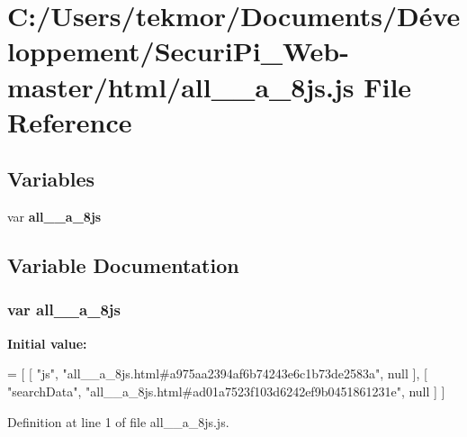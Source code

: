 \section{C\+:/\+Users/tekmor/\+Documents/\+Développement/\+Securi\+Pi\+\_\+\+Web-\/master/html/all\+\_\+\+\_\+a\+\_\+8js.js File Reference}
\label{all____a__8js_8js}
\subsection*{Variables}
\begin{DoxyCompactItemize}
\item 
var {\bf all\+\_\+\+\_\+a\+\_\+8js}
\end{DoxyCompactItemize}


\subsection{Variable Documentation}
\subsubsection[{all\+\_\+\+\_\+a\+\_\+8js}]{\setlength{\rightskip}{0pt plus 5cm}var all\+\_\+\+\_\+a\+\_\+8js}\label{all____a__8js_8js_a9b92bc987767d7f7f323e914e626f600}
{\bfseries Initial value\+:}
\begin{DoxyCode}
=
[
    [ \textcolor{stringliteral}{"js"}, \textcolor{stringliteral}{"all\_\_a\_8js.html#a975aa2394af6b74243e6c1b73de2583a"}, null ],
    [ \textcolor{stringliteral}{"searchData"}, \textcolor{stringliteral}{"all\_\_a\_8js.html#ad01a7523f103d6242ef9b0451861231e"}, null ]
]
\end{DoxyCode}


Definition at line 1 of file all\+\_\+\+\_\+a\+\_\+8js.\+js.


